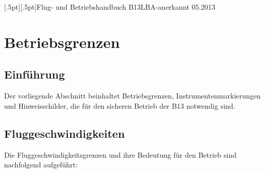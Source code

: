 [.5pt][.5pt]{\pagemark}{}{\headmark}{Flug- und Betriebshandbuch B13}{}{LBA-anerkannt 05.2013}
\pagestyle{Flughandbuch}
\renewcommand*\chapterpagestyle{Flughandbuch}


\chapter{ Betriebsgrenzen}

\section{Einführung}
Der vorliegende Abschnitt beinhaltet Betriebsgrenzen, Instrumentenmarkierungen und Hinweisschilder, die für den sicheren Betrieb der B13 notwendig sind. 

\section{Fluggeschwindigkeiten}

Die Fluggeschwindigkeitsgrenzen und ihre Bedeutung für den Betrieb sind nachfolgend aufgeführt:


